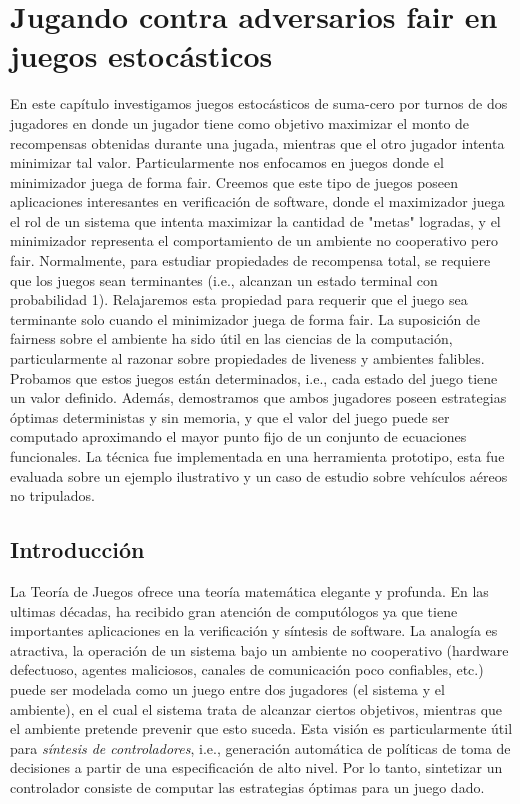 \chapter{Jugando contra adversarios fair en juegos estocásticos}
\label{cap:fairAdversaries}

En este capítulo investigamos juegos estocásticos de suma-cero por turnos de dos jugadores en donde un jugador tiene como objetivo maximizar el monto de recompensas obtenidas durante una jugada, mientras que el otro jugador intenta minimizar tal valor. Particularmente nos enfocamos en juegos donde el minimizador juega de forma fair. Creemos que este tipo de juegos poseen aplicaciones interesantes en verificación de software, donde el maximizador juega el rol de un sistema que intenta maximizar la cantidad de "metas" logradas, y el minimizador representa el comportamiento de un ambiente no cooperativo pero fair.
Normalmente, para estudiar propiedades de recompensa total, se requiere que los juegos sean terminantes (i.e., alcanzan un estado terminal con probabilidad 1). 
Relajaremos esta propiedad para requerir que el juego sea terminante solo cuando el minimizador juega de forma fair. La suposición de fairness sobre el ambiente ha sido útil en las ciencias de la computación, particularmente al razonar sobre propiedades de liveness y ambientes falibles.
Probamos que estos juegos están determinados, i.e., cada estado del juego tiene un valor definido. Además, demostramos que ambos jugadores poseen estrategias óptimas deterministas y sin memoria, y que el valor del juego puede ser computado aproximando el mayor punto fijo de un conjunto de ecuaciones funcionales. La técnica fue implementada en una herramienta prototipo, esta fue evaluada sobre un ejemplo ilustrativo y un caso de estudio sobre vehículos aéreos no tripulados.

\section{Introducción} \label{sec:intro}
La Teoría de Juegos \cite{MorgensternNeuman42}  ofrece una teoría matemática elegante y profunda. 
En las ultimas décadas, ha recibido gran atención de computólogos ya que tiene importantes aplicaciones en la verificación y síntesis de software. 
La analogía es atractiva, la operación de un sistema bajo un ambiente no cooperativo (hardware defectuoso, agentes maliciosos, canales de comunicación poco confiables, etc.) puede ser modelada como un juego entre dos jugadores (el sistema y el ambiente), en el cual el sistema trata de alcanzar ciertos objetivos, mientras que el ambiente pretende prevenir que esto suceda. 
Esta visión es particularmente útil para \emph{síntesis de controladores}, i.e., generación automática de políticas de toma de decisiones a partir de una especificación de alto nivel. 
Por lo tanto, sintetizar un controlador consiste de computar las estrategias óptimas para un juego dado.
		
